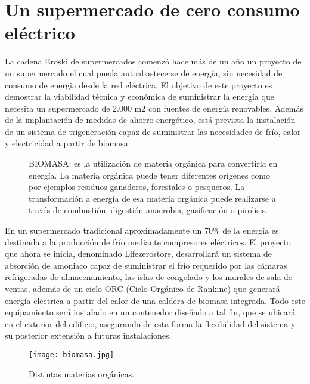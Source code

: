 \section{Un supermercado de cero consumo eléctrico}
\cappar La cadena Eroski de supermercados comenzó hace más de un año un proyecto de un supermercado el cual pueda autoabastecerse de energía, sin necesidad de consumo de energia desde la red eléctrica. El objetivo de este proyecto es demostrar la viabilidad técnica y económica de suministrar la energía que necesita un supermercado de 2.000 m2 con fuentes de energía renovables. Además de la implantación de medidas de ahorro energético, está prevista la instalación de un sistema de trigeneración capaz de suministrar las necesidades de frío, calor y electricidad a partir de biomasa.
\begin{wrapfigure}{r}{0.5\textwidth} 
  \begin{mybox}
    BIOMASA: es la utilización de materia orgánica para convertirla en energía. La materia orgánica puede tener diferentes orígenes como por ejemplos residuos ganaderos, forestales o pesqueros. La transformación a energía de esa materia orgánica puede realizarse a través de combustión, digestión anaerobia, gasificación o pirolisis. 
  \end{mybox}
\end{wrapfigure}

En un supermercado tradicional aproximadamente un 70\% de la energía es destinada a la producción de frío mediante compresores eléctricos. El proyecto que ahora se inicia, denominado Lifezerostore, desarrollará un sistema de absorción de amoniaco capaz de suministrar el frío requerido por las cámaras refrigeradas de almacenamiento, las islas de congelado y los murales de sala de ventas, además de un ciclo ORC (Ciclo Orgánico de Rankine) que generará energía eléctrica a partir del calor de una caldera de biomasa integrada. Todo este equipamiento será instalado en un contenedor diseñado a tal fin, que se ubicará en el exterior del edificio, asegurando de esta forma la flexibilidad del sistema y su posterior extensión a futuras instalaciones. 

\begin{wrapfigure}{r}{0.5\textwidth} 
  \begin{figurebox}
    \vspace{0.5
cm}
  \centering
  \texttt{[image: biomasa.jpg]}
  \caption{Distintas materias orgánicas.}
  \label{fig:1}
\end{figurebox}
\end{wrapfigure}

